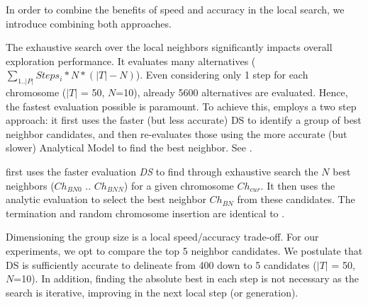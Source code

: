 \subsubsection{\gah}

In order to combine the benefits of \gads speed  and \gaana accuracy in the local search, we introduce \gah combining both approaches.

The exhaustive search over the local neighbors significantly impacts overall exploration performance. It evaluates many alternatives ($ \sum_{1 .. \lvert P \rvert} Steps_{i} * N * (\lvert T \rvert - N)$). Even considering only 1 step for each chromosome ($\lvert T \rvert$ = 50, $N$=10), already 5600 alternatives are evaluated. Hence, the fastest evaluation possible is paramount. To achieve this, \gah employs a two step approach: it first uses the faster (but less accurate) DS to identify a group of best neighbor candidates, and then re-evaluates those using the more accurate (but slower) Analytical Model to find the best neighbor. See . 

\gah first uses the faster evaluation \emph{DS} to find through exhaustive search the $N$ best neighbors ($Ch_{BN0}$ .. $Ch_{BNN}$) for a given chromosome $Ch_{cur}$. It then uses the analytic evaluation to select the best neighbor $Ch_{BN}$ from these candidates. The termination and random chromosome insertion are identical to \gads.

Dimensioning the group size is a local speed/accuracy trade-off. For our experiments, we opt to compare the top 5 neighbor candidates. We postulate that DS is sufficiently accurate to delineate from 400 down to 5 candidates ($\lvert T \rvert$ = 50, $N$=10). In addition, finding the absolute best in each step is not necessary as the search is iterative, improving in the next local step (or generation).


